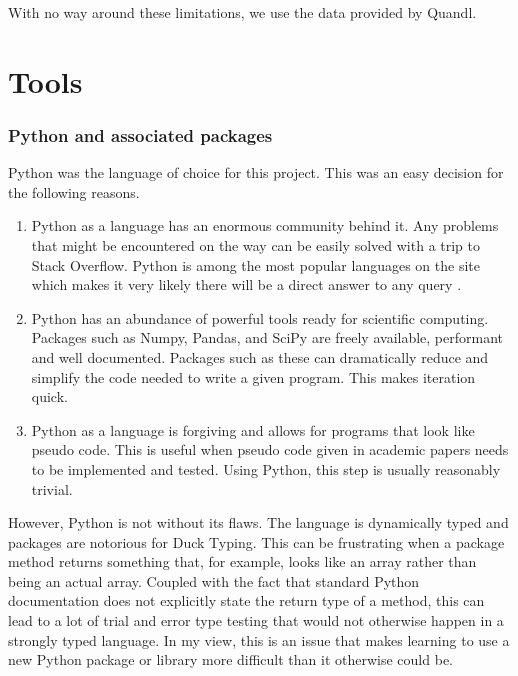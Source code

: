 \documentclass{report}
\begin{document}
With no way around these limitations, we use the data provided by Quandl.

\section{Tools}
\subsubsection{Python and associated packages}

Python was the language of choice for this project. This was an easy decision for the following reasons.

\begin{enumerate}
  \item Python as a language has an enormous community behind it. Any problems that might be encountered on the way can be easily solved with a trip to Stack Overflow. Python is among the most popular languages on the site which makes it very likely there will be a direct answer to any query \cite{website:redmonk-languages}. 
  
  \item Python has an abundance of powerful tools ready for scientific computing. Packages such as Numpy, Pandas, and SciPy are freely available, performant and well documented. Packages such as these can dramatically reduce and simplify the code needed to write a given program. This makes iteration quick.

  \item Python as a language is forgiving and allows for programs that look like pseudo code. This is useful when pseudo code given in academic papers needs to be implemented and tested. Using Python, this step is usually reasonably trivial.

\end{enumerate}

However, Python is not without its flaws. The language is dynamically typed and packages are notorious for Duck Typing. This can be frustrating when a package method returns something that, for example, looks like an array rather than being an actual array. Coupled with the fact that standard Python documentation does not explicitly state the return type of a method, this can lead to a lot of trial and error type testing that would not otherwise happen in a strongly typed language. In my view, this is an issue that makes learning to use a new Python package or library more difficult than it otherwise could be.
\end{document}
